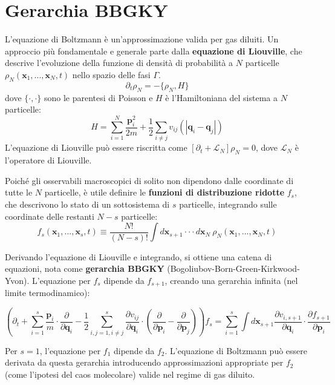 \section{Gerarchia BBGKY}
L'equazione di Boltzmann è un'approssimazione valida per gas diluiti. Un approccio più fondamentale e generale parte dalla \textbf{equazione di Liouville}, che descrive l'evoluzione della funzione di densità di probabilità a $N$ particelle $\rho_N(\mathbf{x}_1, ..., \mathbf{x}_N, t)$ nello spazio delle fasi $\Gamma$.
\begin{equation}
\partial_{t}\rho_{N}=-\{\rho_{N},H\}
\end{equation}
dove $\{\cdot,\cdot\}$ sono le parentesi di Poisson e $H$ è l'Hamiltoniana del sistema a $N$ particelle:
\begin{equation}
H=\sum_{i=1}^N \frac{\mathbf{p}_{i}^{2}}{2m}+\frac{1}{2}\sum_{i\ne j}v_{ij}(|\mathbf{q}_{i}-\mathbf{q}_{j}|)
\end{equation}
L'equazione di Liouville può essere riscritta come $[\partial_t + \mathcal{L}_N]\rho_N = 0$, dove $\mathcal{L}_N$ è l'operatore di Liouville.

Poiché gli osservabili macroscopici di solito non dipendono dalle coordinate di tutte le $N$ particelle, è utile definire le \textbf{funzioni di distribuzione ridotte} $f_s$, che descrivono lo stato di un sottosistema di $s$ particelle, integrando sulle coordinate delle restanti $N-s$ particelle:
\begin{equation}
f_{s}(\mathbf{x}_{1},...,\mathbf{x}_{s},t)\equiv\frac{N!}{(N-s)!}\int d\mathbf{x}_{s+1}\cdot\cdot\cdot d\mathbf{x}_{N}~\rho_{N}(\mathbf{x}_{1},...,\mathbf{x}_{N},t)
\end{equation}

Derivando l'equazione di Liouville e integrando, si ottiene una catena di equazioni, nota come \textbf{gerarchia BBGKY} (Bogoliubov-Born-Green-Kirkwood-Yvon). L'equazione per $f_s$ dipende da $f_{s+1}$, creando una gerarchia infinita (nel limite termodinamico):

\begin{equation}
\left( \partial_t + \sum_{i=1}^s \frac{\mathbf{p}_i}{m}\cdot\frac{\partial}{\partial\mathbf{q}_i} - \frac{1}{2}\sum_{i,j=1, i \neq j}^s \frac{\partial v_{ij}}{\partial\mathbf{q}_i}\cdot\left(\frac{\partial}{\partial\mathbf{p}_i} - \frac{\partial}{\partial\mathbf{p}_j}\right) \right) f_s = \sum_{i=1}^s \int d\mathbf{x}_{s+1} \frac{\partial v_{i,s+1}}{\partial\mathbf{q}_i}\cdot\frac{\partial f_{s+1}}{\partial\mathbf{p}_i}
\end{equation}

Per $s=1$, l'equazione per $f_1$ dipende da $f_2$. L'equazione di Boltzmann può essere derivata da questa gerarchia introducendo approssimazioni appropriate per $f_2$ (come l'ipotesi del caos molecolare) valide nel regime di gas diluito.
